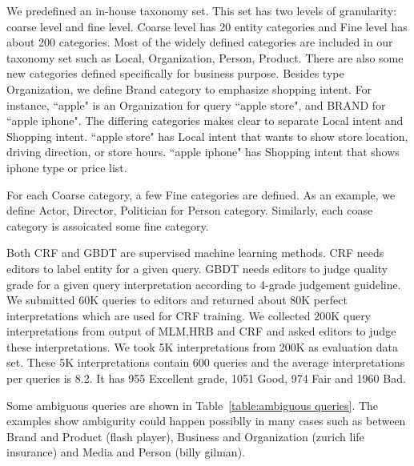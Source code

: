 \documentclass[11pt]{article}
\begin{document}
We predefined an in-house taxonomy set. This set has two levels of granularity: coarse level and fine level. Coarse level has 20 entity categories and Fine level has about 200 categories. Most of the widely defined categories are included in our taxonomy set such as Local, Organization, Person, Product. There are also some new categories defined specifically for business purpose. Besides type Organization, we define Brand category to emphasize shopping intent. For instance, ``apple" is an Organization for query ``apple store", and BRAND for ``apple iphone". The differing categories makes clear to separate Local intent and Shopping intent. ``apple store" has Local intent that wants to show store location, driving direction, or store hours.  ``apple iphone" has Shopping intent that shows iphone type or price list. 

For each Coarse category, a few Fine categories are defined. As an example, we define Actor, Director, Politician for Person category. Similarly, each coase category is assoicated some fine category.


Both CRF and GBDT are supervised machine learning methods. CRF needs editors to label entity for a given query.  GBDT needs editors to judge quality grade for a given query interpretation according to 4-grade judgement guideline. We submitted 60K queries to editors and returned about 80K  perfect interpretations which are used for CRF training. We collected 200K query interpretations from output of MLM,HRB and CRF and asked editors to judge these interpretations. We took 5K interpretations from 200K as evaluation data set. These 5K interpretations contain 600 queries and the average interpretations per queries is 8.2. It has 955 Excellent grade, 1051 Good, 974 Fair and 1960 Bad. 
  

Some ambiguous queries are shown in Table~\ref{table:ambiguous queries}. The examples show ambigurity could happen possiblly in many cases such as  between Brand and Product (flash player), Business and Organization (zurich life insurance) and Media and Person (billy gilman). 
\end{document}
